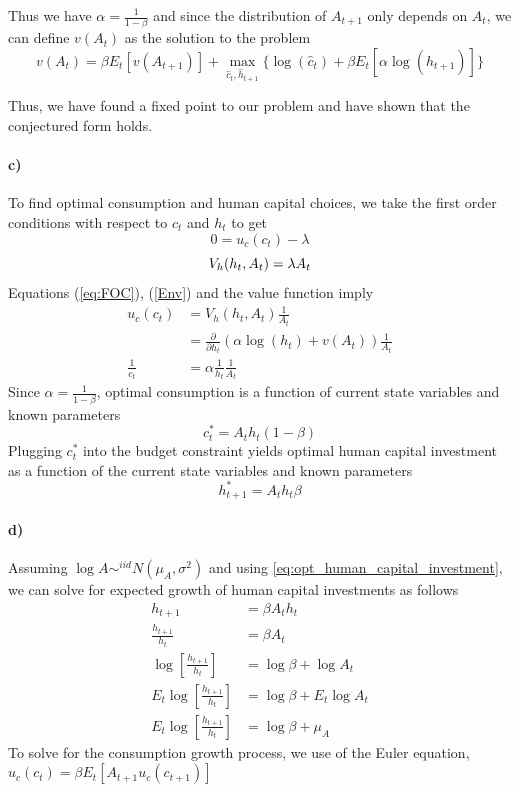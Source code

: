 \documentclass[11pt,letter]{article}
\begin{document}
Thus we have $\alpha = \frac{1}{1-\beta}$ and since the distribution of $A_{t+1}$ only depends on $A_t$, we can define $v(A_t)$ as the solution to the problem
\begin{equation*}
	v(A_t) = \beta E_t[v(A_{t+1})] + \max_{\hat{c}_t,\hat{h}_{t+1}}\{\log(\hat{c}_t) + \beta E_t\left[ \alpha \log(\hat{h}_{t+1})\right] \}
\end{equation*}

Thus, we have found a fixed point to our problem and have shown that the conjectured form holds. 


\paragraph{c)}
To find optimal consumption and human capital choices, we take the first order conditions with respect to $c_t$ and $h_t$ to get
\begin{equation}
0 = u_c(c_t) - \lambda
\label{eq:FOC}
\end{equation}
\begin{equation}\label{Env}
V_h(h_t, A_t) = \lambda A_t\\
\end{equation}
Equations (\ref{eq:FOC}), (\ref{Env}) and the value function imply
\begin{align*}
u_c(c_t)		&= V_h(h_t, A_t)\frac{1}{A_t}\\
&= \frac{\partial}{\partial h_t}(\alpha \log(h_t) + v(A_t))\frac{1}{A_t}\\
\frac{1}{c_t}	&= \alpha \frac{1}{h_t}\frac{1}{A_t}
\end{align*}
Since $\alpha = \frac{1}{1 - \beta}$, optimal consumption is a function of current state variables and known parameters
\begin{equation}
c_t^* = A_t h_t (1-\beta)
\end{equation}
Plugging $c_t^*$ into the budget constraint yields optimal human capital investment as a function of the current state variables and known parameters
\begin{equation}
h_{t+1}^*=A_t h_t \beta 
\label{eq:opt_human_capital_investment}
\end{equation}

\paragraph{d)}
Assuming $\log A \sim^{iid} N(\mu_A,\sigma^2)$ and using \ref{eq:opt_human_capital_investment}, we can solve for expected growth of human capital investments as follows
\begin{align*}
h_{t+1} 								&= \beta A_t h_t\\
\frac{h_{t+1}}{h_t} 					&= \beta A_t\\
\log\left[\frac{h_{t+1}}{h_t}\right] 	&= \log\beta +\log A_t\\
E_t \log\left[\frac{h_{t+1}}{h_t}\right] 	&= \log\beta + E_t \log A_t\\
E_t \log\left[\frac{h_{t+1}}{h_t}\right] 	&= \log\beta + \mu_A
\end{align*}
To solve for the consumption growth process, we use of the Euler equation,  $u_c(c_t) = \beta E_t [A_{t+1}u_c(c_{t+1})]$
\end{document}
